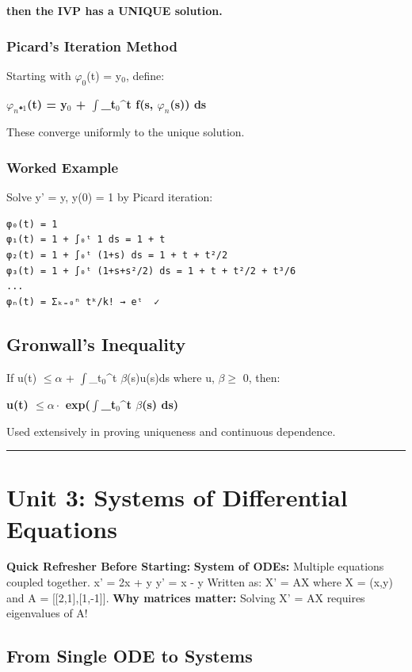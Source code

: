 \documentclass[12pt,a4paper,openany]{book}
\begin{document}
{{\textbf{then the IVP has a UNIQUE solution.}

\subsubsection{Picard's Iteration Method}

Starting with $\varphi_0$(t) = y$_0$, define:

\textbf{$\varphi_n$₊$_1$(t) = y$_0$ + $\int$_{t$_0$}^{t} f(s, $\varphi_n$(s)) ds}

These converge uniformly to the unique solution.

\subsubsection{Worked Example }
Solve y' = y, y(0) = 1 by Picard iteration:

\begin{verbatim}
φ₀(t) = 1
φ₁(t) = 1 + ∫₀ᵗ 1 ds = 1 + t
φ₂(t) = 1 + ∫₀ᵗ (1+s) ds = 1 + t + t²/2
φ₃(t) = 1 + ∫₀ᵗ (1+s+s²/2) ds = 1 + t + t²/2 + t³/6
...
φₙ(t) = Σₖ₌₀ⁿ tᵏ/k! → eᵗ  ✓
\end{verbatim}

\subsection{Gronwall's Inequality }

If u(t) $\leq\alpha$ + $\int$_{t$_0$}^{t} $\beta$(s)u(s)ds where u, $\beta\geq$ 0, then:

\textbf{u(t) $\leq\alpha\cdot$ exp($\int$_{t$_0$}^{t} $\beta$(s) ds)}

Used extensively in proving uniqueness and continuous dependence.

\bigskip\noindent\rule{\textwidth}{0.4pt}\bigskip

\section{Unit 3: Systems of Differential Equations}

\begin{prereqbox}
 \textbf{Quick Refresher Before Starting:}
\textbf{System of ODEs:} Multiple equations coupled together.
x' = 2x + y
y' = x - y
Written as: X' = AX where X = (x,y) and A = [[2,1],[1,-1]].
\textbf{Why matrices matter:} Solving X' = AX requires eigenvalues of A!
\end{prereqbox}


\subsection{From Single ODE to Systems}

}}
\end{document}
